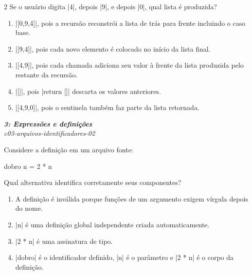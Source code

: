 \documentclass[a4paper,10pt,brazil]{article}
\begin{document}
\begin{multicols}{2}
Se o usuário digita \haskellinline|4|, depois \haskellinline|9|, e depois \haskellinline|0|, qual lista é produzida?

\begin{enumerate}
  \item \haskellinline|[0,9,4]|, pois a recursão reconstrói a lista de trás para frente incluindo o caso base.

  \item \haskellinline|[9,4]|, pois cada novo elemento é colocado no início da lista final.

  \item \haskellinline|[4,9]|, pois cada chamada adiciona seu valor à frente da lista produzida pelo restante da recursão.

  \item \haskellinline|[]|, pois \haskellinline|return []| descarta os valores anteriores.

  \item \haskellinline|[4,9,0]|, pois o sentinela também faz parte da lista retornada.


\end{enumerate}

\begin{flushright}
  \footnotesize
  \textit{\textbf{3: Expressões e definições}}\\
  \textit{c03-arquivos-identificadores-02}\\

\end{flushright}
Considere a definição em um arquivo fonte:

\begin{haskellcode}
dobro n = 2 * n
\end{haskellcode}

Qual alternativa identifica corretamente seus componentes?

\begin{enumerate}
  \item A definição é inválida porque funções de um argumento exigem vírgula depois do nome.

  \item \haskellinline|n| é uma definição global independente criada automaticamente.

  \item \haskellinline|2 * n| é uma assinatura de tipo.

  \item \haskellinline|dobro| é o identificador definido, \haskellinline|n| é o parâmetro e \haskellinline|2 * n| é o corpo da definição.


\end{enumerate}
\end{multicols}
\end{document}
